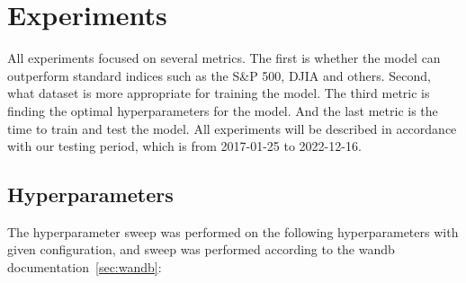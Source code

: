 \documentclass[../xlapes02]{subfiles}
\begin{document}
    \section{Experiments}\label{sec:experiments}
    All experiments focused on several metrics. The first is whether the model can outperform standard indices such as the S\&P 500, DJIA and others. Second, what dataset is more appropriate for training the model. The third metric is finding the optimal hyperparameters for the model. And the last metric is the time to train and test the model. All experiments will be described in accordance with our testing period, which is from 2017-01-25 to 2022-12-16.

    \subsection{Hyperparameters}\label{subsec:hyperparameters}
    The hyperparameter sweep was performed on the following hyperparameters with given configuration, and sweep was performed according to the wandb documentation~\cref{sec:wandb}:
\end{document}
